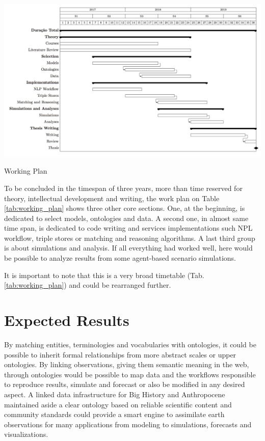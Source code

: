 \documentclass[
	12pt, %
	a4paper, %
	oneside, %
	headinclude, footinclude, %
	BCOR5mm, %
]{scrartcl}
\begin{document}
	\begin{table}[h]
    \centering
  	\includegraphics[width=1.00\columnwidth]{timetable_png}
		\caption[Working Plan]{Working Plan}
		\label{tab:working_plan}
	\end{table}

To be concluded in the timespan of three years, more than time reserved for theory, intellectual development and writing, the work plan on Table \ref{tab:working_plan} shows three other core sections. One, at the beginning, is dedicated to select models, ontologies and data. A second one, in almost same time span, is dedicated to code writing and services implementations such NPL workflow, triple stores or matching and reasoning algorithms. A last third group is about simulations and analysis. If all everything had worked well, here would be possible to analyze results from some agent-based scenario simulations.

It is important to note that this is a very broad timetable (Tab. \ref{tab:working_plan}) and could be rearranged further.

\section{Expected Results}

By matching entities, terminologies and vocabularies with ontologies, it could be possible to inherit formal relationships from more abstract scales or upper ontologies. By linking observations, giving them semantic meaning in the web, through ontologies would be possible to map data and the workflows responsible to reproduce results, simulate and forecast \citep{patton_semnext:_2015} or also be modified in any desired aspect. A linked data infrastructure for Big History and Anthropocene maintained aside a clear ontology based on reliable scientific content \citep{gil_towards_2007} and community standards \citep{w3c_w3c_2015} could provide a smart engine to assimilate earth observations for many applications from modeling to simulations, forecasts and visualizations.
\end{document}
